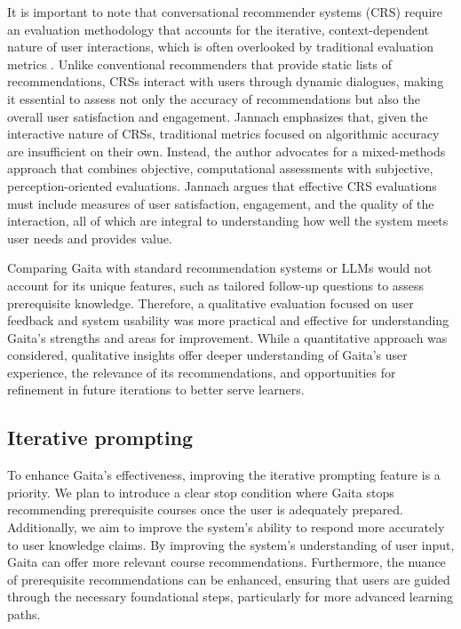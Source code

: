 It is important to note that conversational recommender systems (CRS) require an evaluation methodology that accounts for the iterative, context-dependent nature of user interactions, which is often overlooked by traditional evaluation metrics \cite{jannach_evaluating_2023}. Unlike conventional recommenders that provide static lists of recommendations, CRSs interact with users through dynamic dialogues, making it essential to assess not only the accuracy of recommendations but also the overall user satisfaction and engagement. Jannach emphasizes that, given the interactive nature of CRSs, traditional metrics focused on algorithmic accuracy are insufficient on their own. Instead, the author advocates for a mixed-methods approach that combines objective, computational assessments with subjective, perception-oriented evaluations. Jannach argues that effective CRS evaluations must include measures of user satisfaction, engagement, and the quality of the interaction, all of which are integral to understanding how well the system meets user needs and provides value.

Comparing Gaita with standard recommendation systems or LLMs would not account for its unique features, such as tailored follow-up questions to assess prerequisite knowledge. Therefore, a qualitative evaluation focused on user feedback and system usability was more practical and effective for understanding Gaita’s strengths and areas for improvement. While a quantitative approach was considered, qualitative insights offer deeper understanding of Gaita’s user experience, the relevance of its recommendations, and opportunities for refinement in future iterations to better serve learners.

\subsection{Iterative prompting}

To enhance Gaita’s effectiveness, improving the iterative prompting feature is a priority. We plan to introduce a clear stop condition where Gaita stops recommending prerequisite courses once the user is adequately prepared. Additionally, we aim to improve the system’s ability to respond more accurately to user knowledge claims. By improving the system’s understanding of user input, Gaita can offer more relevant course recommendations. Furthermore, the nuance of prerequisite recommendations can be enhanced, ensuring that users are guided through the necessary foundational steps, particularly for more advanced learning paths. 

